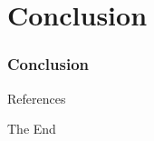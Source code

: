 \documentclass{beamer}
\begin{document}




\section{Conclusion}
\begin{frame}
  \frametitle{Conclusion}



\end{frame}


\begin{frame}[allowframebreaks]{References}
  
  
\end{frame}


\begin{frame}
  \Huge{\centerline{The End}}
\end{frame}

\end{document}

